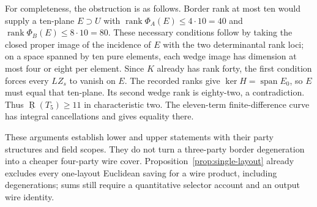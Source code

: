 For completeness, the obstruction is as follows. Border rank at most ten would supply a ten-plane $E\supset U$ with
$\operatorname{rank}\Phi_A(E)\leq4\cdot10=40$ and
$\operatorname{rank}\Phi_B(E)\leq8\cdot10=80$.
These necessary conditions follow by taking the closed proper image of the incidence of $E$ with the two determinantal rank loci; on a space spanned by ten pure elements, each wedge image has dimension at most four or eight per element. Since $K$ already has rank forty, the first condition forces every $LZ_s$ to vanish on $E$. The recorded ranks give $\ker H=\operatorname{span}E_0$, so $E$ must equal that ten-plane. Its second wedge rank is eighty-two, a contradiction. Thus $\underline{\operatorname R}(T_5)\geq11$ in characteristic two. The eleven-term finite-difference curve has integral cancellations and gives equality there.

These arguments establish lower and upper statements with their party structures and field scopes. They do not turn a three-party border degeneration into a cheaper four-party wire cover. Proposition~\ref{prop:single-layout} already excludes every one-layout Euclidean saving for a wire product, including degenerations; sums still require a quantitative selector account and an output wire identity.
